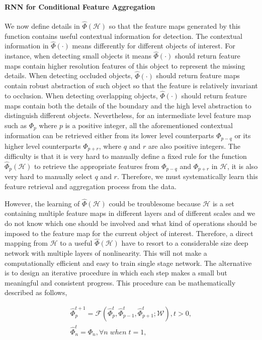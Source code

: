 \documentclass[10pt,twocolumn,letterpaper]{article}
\begin{document}
\paragraph{RNN for Conditional Feature Aggregation}
We now define details in $\hat{\Phi}(\mathcal{H})$ so that the feature maps generated by this function contains useful contextual information for detection. The contextual information in $\hat{\Phi}(\cdot)$ means differently for different objects of interest. For instance, when detecting small objects it means $\hat{\Phi}(\cdot)$ should return feature maps contain higher resolution features of this object to represent the missing details. When detecting occluded objects, $\hat{\Phi}(\cdot)$ should return feature maps contain robust abstraction of such object so that the feature is relatively invariant to occlusion. When detecting overlapping objects, $\hat{\Phi}(\cdot)$ should return feature maps contain both the details of the boundary and the high level abstraction to distinguish different objects. Nevertheless, for an intermediate level feature map such as $\Phi_{p}$ where $p$ is a positive integer, all the aforementioned contextual information can be retrieved either from its lower level counterparts $\Phi_{p-q}$ or its higher level counterparts $\Phi_{p+r}$, where $q$ and $r$ are also positive integers. The difficulty is that it is very hard to manually define a fixed rule for the function $\hat{\Phi}_{p}(\mathcal{H})$ to retrieve the appropriate features from $\Phi_{p-q}$ and $\Phi_{p+r}$ in $\mathcal{H}$, it is also very hard to manually select $q$ and $r$. Therefore, we must systematically learn this feature retrieval and aggregation process from the data.

However, the learning of $\hat{\Phi}(\mathcal{H})$ could be troublesome because $\mathcal{H}$ is a set containing multiple feature maps in different layers and of  different scales and we do not know which one should be involved and what kind of operations should be imposed to the feature map for the current object of interest. Therefore, a direct mapping from $\mathcal{H}$ to a useful $\hat{\Phi}(\mathcal{H})$ have to resort to a considerable size deep network with multiple layers of nonlinearity. This will not make a computationally efficient and easy to train single stage network. The alternative is to design an iterative procedure in which each step makes a small but meaningful and consistent progress. This procedure can be mathematically described as follows,

\vspace{-0.5\baselineskip}
\begin{equation}
\begin{split}
\hat{\Phi}_p^{t+1} = \mathcal{F}(\hat{\Phi}_p^t, \hat{\Phi}_{p-1}^t, \hat{\Phi}_{p+1}^t;\mathcal{W}), t > 0, \\
\hat{\Phi}_n^t = \Phi_n,\forall n \; when \; t = 1,
\end{split}
\label{eq:rnn_refine}
\end{equation}
\end{document}
